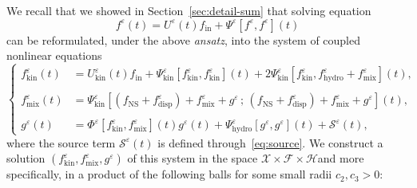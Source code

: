 \documentclass[10pt]{amsart}
\theoremstyle{definition}\newtheorem{defi}[theo]{Definition}\newtheorem{rema}[theo]{Remark}\newtheorem{exam}[theo]{Example}\newtheorem{exem}[theo]{Example}\newtheorem{nota}[theo]{Notation}
\newcommand{\ini}{\mathrm{in}}
\newcommand{\ns}{\mathrm{NS}}
\newcommand{\hyd}{\mathrm{hydro}}
\newcommand{\mix}{\mathrm{mix}}
\newcommand{\kin}{\mathrm{kin}}
\newcommand{\disp}{\mathrm{disp}}
\renewcommand{\SS}{\mathcal{S}}
\newcommand{\FFF}{\mathscr{F}}
\newcommand{\HHH}{\mathscr{H}}
\newcommand{\GGG}{\mathscr{X}}
\newcommand{\SSSs}{\HHH}
\newcommand{\SSSl}{\GGG}
\newcommand{\SSSm}{\FFF}
\newcommand*\eps{{\varepsilon}}
\begin{document}
We recall that we showed in Section~\ref{sec:detail-sum} that solving equation
\[
f^\eps(t)=U^\eps(t)f_\ini+\Psi^\eps\left[f^\eps,f^\eps\right](t)
\]
can be reformulated, under the above \emph{ansatz}, into the system of coupled nonlinear equations
\begin{equation}\label{eq:systemKinMixG-1}
\begin{cases}
f^\eps_\kin(t) &= U^\eps_\kin(t) f_\ini + \Psi^\eps_\kin \left[f^\eps_\kin, f^\eps_\kin \right](t) + 2 \Psi^\eps_\kin\left[f^\eps_\kin, f^\eps_\hyd + f^\eps_\mix\right](t),\\
\\
f^\eps_\mix(t) &=\Psi^\eps_\kin\left[\left(f_\ns + f^\eps_\disp\right)+ f_\mix^\eps+g^\eps\,;\,\left(f_\ns + f^\eps_\disp\right)+ f_\mix^\eps+g^\eps \right](t),\\
\\
g^\eps(t) &= \Phi^\eps\left[f^\eps_\kin, f^\eps_\mix\right](t) g^\eps(t)+
\Psi^\eps_\hyd\left[g^\eps, g^\eps\right](t) + \SS^\eps(t),
\end{cases}
\end{equation}
where the source term $\SS^\eps(t)$ is defined through~\eqref{eq:source}. We construct a solution $(f^\eps_\kin, f^\eps_\mix, g^\eps)$ of this system in the space $ \SSSl \times \SSSm \times \SSSs $and more specifically, in a product of the following balls for some small radii $ c_2, c_3 >0$:
\end{document}
